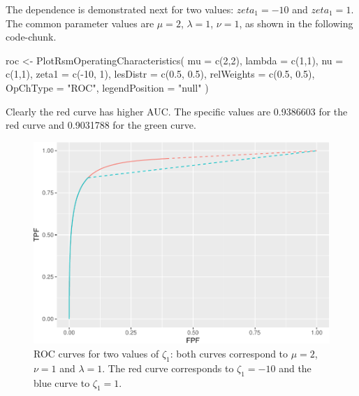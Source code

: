 \documentclass[
]{book}
\newenvironment{Shaded}{\begin{snugshade}}{\end{snugshade}}
\newcommand{\AttributeTok}[1]{\textcolor[rgb]{0.77,0.63,0.00}{#1}}
\newcommand{\DecValTok}[1]{\textcolor[rgb]{0.00,0.00,0.81}{#1}}
\newcommand{\FloatTok}[1]{\textcolor[rgb]{0.00,0.00,0.81}{#1}}
\newcommand{\FunctionTok}[1]{\textcolor[rgb]{0.00,0.00,0.00}{#1}}
\newcommand{\NormalTok}[1]{#1}
\newcommand{\OtherTok}[1]{\textcolor[rgb]{0.56,0.35,0.01}{#1}}
\newcommand{\SpecialCharTok}[1]{\textcolor[rgb]{0.00,0.00,0.00}{#1}}
\newcommand{\StringTok}[1]{\textcolor[rgb]{0.31,0.60,0.02}{#1}}
\begin{document}
The dependence is demonstrated next for two values: \(zeta_1 = -10\) and \(zeta_1 = 1\). The common parameter values are \(\mu = 2\), \(\lambda = 1\), \(\nu = 1\), as shown in the following code-chunk.

\begin{Shaded}
\begin{Highlighting}[]
\NormalTok{roc }\OtherTok{\textless{}{-}} \FunctionTok{PlotRsmOperatingCharacteristics}\NormalTok{(}
     \AttributeTok{mu =} \FunctionTok{c}\NormalTok{(}\DecValTok{2}\NormalTok{,}\DecValTok{2}\NormalTok{),}
     \AttributeTok{lambda =} \FunctionTok{c}\NormalTok{(}\DecValTok{1}\NormalTok{,}\DecValTok{1}\NormalTok{),}
     \AttributeTok{nu =} \FunctionTok{c}\NormalTok{(}\DecValTok{1}\NormalTok{,}\DecValTok{1}\NormalTok{),}
     \AttributeTok{zeta1 =} \FunctionTok{c}\NormalTok{(}\SpecialCharTok{{-}}\DecValTok{10}\NormalTok{, }\DecValTok{1}\NormalTok{),}
     \AttributeTok{lesDistr =} \FunctionTok{c}\NormalTok{(}\FloatTok{0.5}\NormalTok{, }\FloatTok{0.5}\NormalTok{),}
     \AttributeTok{relWeights =} \FunctionTok{c}\NormalTok{(}\FloatTok{0.5}\NormalTok{, }\FloatTok{0.5}\NormalTok{),}
     \AttributeTok{OpChType =} \StringTok{"ROC"}\NormalTok{,}
     \AttributeTok{legendPosition =} \StringTok{"null"}
\NormalTok{)}
\end{Highlighting}
\end{Shaded}

Clearly the red curve has higher AUC. The specific values are 0.9386603 for the red curve and 0.9031788 for the green curve.

\begin{figure}
\centering
\includegraphics{17a-rsm-predictions_files/figure-latex/rsm-pred-roc-zeta1-1.pdf}
\caption{\label{fig:rsm-pred-roc-zeta1}ROC curves for two values of \(\zeta_1\): both curves correspond to \(\mu = 2\), \(\nu = 1\) and \(\lambda = 1\). The red curve corresponds to \(\zeta_1 = -10\) and the blue curve to \(\zeta_1 = 1\).}
\end{figure}
\end{document}
